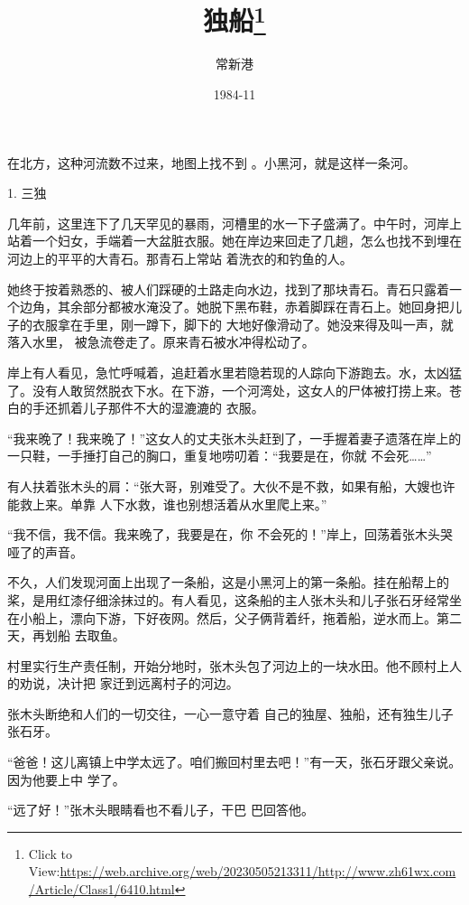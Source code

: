 \documentclass{article}
\title{独船\footnote{Click to View:\url{https://web.archive.org/web/20230505213311/http://www.zh61wx.com/Article/Class1/6410.html}}}
\author{常新港}
\date{1984-11}
\begin{document}

\maketitle


\Large

﻿在北方，这种河流数不过来，地图上找不到
。小黑河，就是这样一条河。 


1. 三独 

几年前，这里连下了几天罕见的暴雨，河槽里的水一下子盛满了。中午时，河岸上站着一个妇女，手端着一大盆脏衣服。她在岸边来回走了几趟，怎么也找不到埋在河边上的平平的大青石。那青石上常站
着洗衣的和钓鱼的人。 

她终于按着熟悉的、被人们踩硬的土路走向水边，找到了那块青石。青石只露着一个边角，其余部分都被水淹没了。她脱下黑布鞋，赤着脚踩在青石上。她回身把儿子的衣服拿在手里，刚一蹲下，脚下的
\newpage
大地好像滑动了。她没来得及叫一声，就落入水里，
被急流卷走了。原来青石被水冲得松动了。 

岸上有人看见，急忙呼喊着，追赶着水里若隐若现的人踪向下游跑去。水，太凶猛了。没有人敢贸然脱衣下水。在下游，一个河湾处，这女人的尸体被打捞上来。苍白的手还抓着儿子那件不大的湿漉漉的
衣服。 

“我来晚了！我来晚了！”这女人的丈夫张木头赶到了，一手握着妻子遗落在岸上的一只鞋，一手捶打自己的胸口，重复地唠叨着：“我要是在，你就
不会死……” 

有人扶着张木头的肩：“张大哥，别难受了。大伙不是不救，如果有船，大嫂也许能救上来。单靠
人下水救，谁也别想活着从水里爬上来。” 

“我不信，我不信。我来晚了，我要是在，你
不会死的！”岸上，回荡着张木头哭哑了的声音。 

\newpage

不久，人们发现河面上出现了一条船，这是小黑河上的第一条船。挂在船帮上的桨，是用红漆仔细涂抹过的。有人看见，这条船的主人张木头和儿子张石牙经常坐在小船上，漂向下游，下好夜网。然后，父子俩背着纤，拖着船，逆水而上。第二天，再划船
去取鱼。 

村里实行生产责任制，开始分地时，张木头包了河边上的一块水田。他不顾村上人的劝说，决计把
家迁到远离村子的河边。 

张木头断绝和人们的一切交往，一心一意守着
自己的独屋、独船，还有独生儿子张石牙。 

“爸爸！这儿离镇上中学太远了。咱们搬回村里去吧！”有一天，张石牙跟父亲说。因为他要上中
学了。 

“远了好！”张木头眼睛看也不看儿子，干巴
巴回答他。 

\newpage
\end{document}
